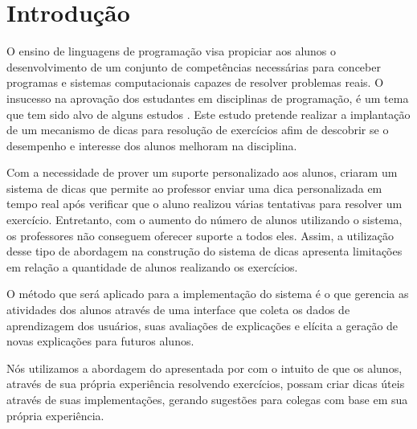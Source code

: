 \chapter{Introdução}

	O ensino de linguagens de programação visa propiciar aos alunos o desenvolvimento de um conjunto de competências necessárias para conceber programas e sistemas computacionais capazes de resolver problemas reais. O insucesso na aprovação dos estudantes em disciplinas de programação, é um tema que tem sido alvo de alguns estudos \cite{bosse2015reprovaccoes, Cukierman:2015:PSU:2729094.2742623}. Este estudo pretende realizar a implantação de um mecanismo de dicas para resolução de exercícios afim de descobrir se o desempenho e interesse dos alunos melhoram na disciplina. 
	
	Com a necessidade de prover um suporte personalizado aos alunos,  criaram um sistema de dicas que permite ao professor enviar uma dica personalizada em tempo real após verificar que o aluno realizou várias tentativas para resolver um exercício. Entretanto, com o aumento do número de alunos utilizando o sistema, os professores não conseguem oferecer suporte a todos eles. Assim, a utilização desse tipo de abordagem na construção do sistema de dicas apresenta limitações em relação a quantidade de alunos realizando os exercícios.
	
	O método que será aplicado para a implementação do sistema é o  que gerencia as atividades dos alunos através de uma interface que coleta os dados de aprendizagem dos usuários, suas avaliações de explicações e elícita a geração de novas explicações para futuros alunos.

	Nós utilizamos a abordagem do  apresentada por  com o intuito de que os alunos, através de sua própria experiência resolvendo exercícios, possam criar dicas úteis através de suas implementações, gerando sugestões para colegas com base em sua própria experiência.